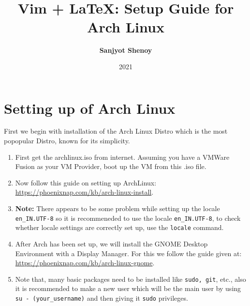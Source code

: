 \documentclass[11pt]{article}
\title{Vim + \LaTeX: Setup Guide for Arch Linux}
\author{\textbf{Sanjyot Shenoy}}
\date{2021}
\theoremstyle{plain}%
\theoremstyle{definition}
\theoremstyle{remark}
\begin{document}
	\maketitle
	\tableofcontents
	\section{Setting up of Arch Linux}
	First we begin with installation of the Arch Linux Distro which is the most popopular Distro, known for its simplicity.
	\begin{enumerate}
		\item First get the archlinux.iso from internet. Assuming you have a VMWare Fusion as your VM Provider, boot up the VM from this .iso file. 
		\item Now follow this guide on setting up ArchLinux:\\ \url{https://phoenixnap.com/kb/arch-linux-install}.
		\item \textbf{Note:} There appears to be some problem while setting up the locale \texttt{en\_IN.UTF-8} so it is recommeneded to use the locale  \texttt{en\_IN.UTF-8}, to check whether locale settings are correctly set up, use the \texttt{locale} command.
		\item After Arch has been set up, we will install the GNOME Desktop Environment with a Display Manager. For this we follow the guide given at:\\ \url{https://phoenixnap.com/kb/arch-linux-gnome}. 
		\item Note that, many basic packages need to be installed like \texttt{sudo, git}, etc., also it is recommended to make a new user which will be the main user by using \texttt{su - (your\_username)} and then giving it \texttt{sudo} privileges.	
	\end{enumerate}
\end{document}
